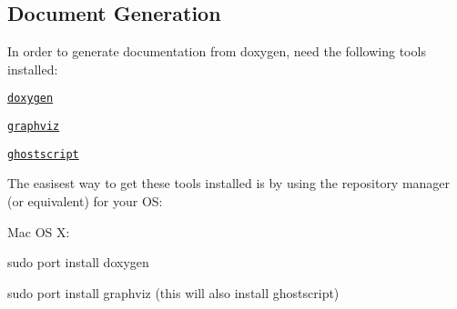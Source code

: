 \subsection*{Document Generation }


\begin{DoxyItemize}
\item In order to generate documentation from doxygen, need the following tools installed\+:
\begin{DoxyItemize}
\item \href{www.doxygen.org}{\tt doxygen}
\item \href{http://www.graphviz.org}{\tt graphviz}
\item \href{https://www.ghostscript.com}{\tt ghostscript}
\end{DoxyItemize}
\item The easisest way to get these tools installed is by using the repository manager (or equivalent) for your O\+S\+:
\begin{DoxyItemize}
\item Mac O\+S X\+:
\begin{DoxyItemize}
\item sudo port install doxygen
\item sudo port install graphviz (this will also install ghostscript) 
\end{DoxyItemize}
\end{DoxyItemize}
\end{DoxyItemize}